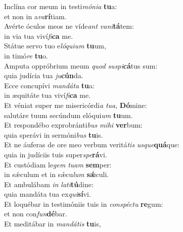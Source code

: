 \evenverse Inclína cor meum in testi\textit{mó}\textit{ni}\textit{a} \textbf{tu}a:~\*\\
\evenverse et non in a\textit{va}\textbf{rí}tiam.\\
\oddverse Avérte óculos meos ne víde\textit{ant} \textit{va}\textit{ni}\textbf{tá}tem:~\*\\
\oddverse in via tua viví\textit{fi}\textbf{ca} me.\\
\evenverse Státue servo tuo e\textit{ló}\textit{qui}\textit{um} \textbf{tu}um,~\*\\
\evenverse in timó\textit{re} \textbf{tu}o.\\
\oddverse Amputa oppróbrium meum \textit{quod} \textit{su}\textit{spi}\textbf{cá}tus sum:~\*\\
\oddverse quia judícia tua \textit{ju}\textbf{cún}da.\\
\evenverse Ecce concupívi \textit{man}\textit{dá}\textit{ta} \textbf{tu}a:~\*\\
\evenverse in æquitáte tua viví\textit{fi}\textbf{ca} me.\\
\oddverse Et véniat super me misericórdi\textit{a} \textit{tu}\textit{a}, \textbf{Dó}mine:~\*\\
\oddverse salutáre tuum secúndum elóqui\textit{um} \textbf{tu}um.\\
\evenverse Et respondébo exprobránti\textit{bus} \textit{mi}\textit{hi} \textbf{ver}bum:~\*\\
\evenverse quia sperávi in sermóni\textit{bus} \textbf{tu}is.\\
\oddverse Et ne áuferas de ore meo verbum veritá\textit{tis} \textit{us}\textit{que}\textbf{quá}que:~\*\\
\oddverse quia in judíciis tuis super\textit{spe}\textbf{rá}vi.\\
\evenverse Et custódiam le\textit{gem} \textit{tu}\textit{am} \textbf{sem}per:~\*\\
\evenverse in sǽculum et in sǽcu\textit{lum} \textbf{sǽ}culi.\\
\oddverse Et ambulábam \textit{in} \textit{la}\textit{ti}\textbf{tú}dine:~\*\\
\oddverse quia mandáta tua ex\textit{qui}\textbf{sí}vi.\\
\evenverse Et loquébar in testimóniis tuis in \textit{con}\textit{spé}\textit{ctu} \textbf{re}gum:~\*\\
\evenverse et non con\textit{fun}\textbf{dé}bar.\\
\oddverse Et meditábar in \textit{man}\textit{dá}\textit{tis} \textbf{tu}is,~\*\\
